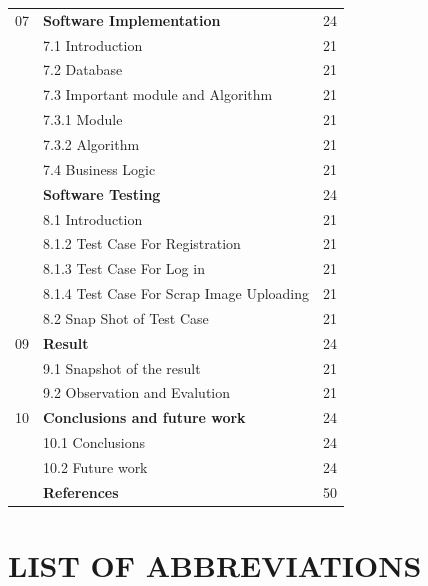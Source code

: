 \begin{longtable}{|p{1cm}|p{12cm}|p{1.5cm}|}
\hline
07& \textbf{Software Implementation} & 24\\
   & 7.1 Introduction & 21\\
   & 7.2 Database & 21\\
   & 7.3 Important module and Algorithm & 21\\
   & 7.3.1 Module & 21\\
   & 7.3.2 Algorithm & 21\\
   & 7.4 Business Logic & 21\\
\hline
\newpage
\hline
08& \textbf{Software Testing} & 24\\
   & 8.1 Introduction & 21\\
   & 8.1.2 Test Case For Registration & 21\\
   & 8.1.3 Test Case For Log in & 21\\
   & 8.1.4 Test Case For Scrap Image Uploading & 21\\
   & 8.2 Snap Shot of Test Case & 21\\

\hline
09& \textbf{Result} & 24\\
   & 9.1 Snapshot of the result & 21\\
   & 9.2 Observation and Evalution & 21\\


\hline
10 & \textbf{Conclusions and future work} & 24\\
   & 10.1 Conclusions & 24\\
   & 10.2 Future work & 24\\
   

\hline
& \textbf{References} & 50\\
\hline
\end{longtable}

\newpage

\chapter*{LIST OF ABBREVIATIONS}
\pagestyle{romanstyle}
\setcounter{page}{1}



